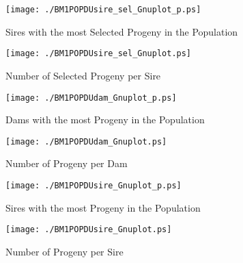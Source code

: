 \begin{figure}[h]
\begin{center}{
\caption{Sires with the most Selected Progeny in the Population}
  \texttt{[image: ./BM1POPDUsire\_sel\_Gnuplot\_p.ps]}
  }\end{center}
  \end{figure}
  

\begin{figure}[h]
\begin{center}{
\caption{Number of Selected Progeny per Sire}
  \texttt{[image: ./BM1POPDUsire\_sel\_Gnuplot.ps]}
  }\end{center}
  \end{figure}
  

\begin{figure}[h]
\begin{center}{
\caption{Dams with the most Progeny in the Population}
  \texttt{[image: ./BM1POPDUdam\_Gnuplot\_p.ps]}
  }\end{center}
  \end{figure}
  

\begin{figure}[h]
\begin{center}{
\caption{Number of Progeny per Dam }
  \texttt{[image: ./BM1POPDUdam\_Gnuplot.ps]}
  }\end{center}
  \end{figure}
  

\begin{figure}[h]
\begin{center}{
\caption{Sires with the most Progeny in the Population}
  \texttt{[image: ./BM1POPDUsire\_Gnuplot\_p.ps]}
  }\end{center}
  \end{figure}
  

\begin{figure}[h]
\begin{center}{
\caption{Number of Progeny per Sire }
  \texttt{[image: ./BM1POPDUsire\_Gnuplot.ps]}
  }\end{center}
  \end{figure}
  

